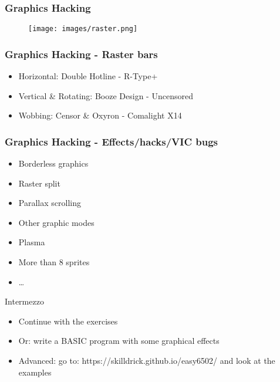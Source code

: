 
\begin{frame}
\frametitle{Graphics Hacking}

\begin{figure}
\texttt{[image: images/raster.png]}
\end{figure}

\end{frame}


\begin{frame}
\frametitle{Graphics Hacking - Raster bars}

\begin{itemize}
\item Horizontal: Double Hotline - R-Type+
\item Vertical \& Rotating: Booze Design - Uncensored
\item Wobbing: Censor \& Oxyron - Comalight X14
\end{itemize}

\end{frame}


\begin{frame}
\frametitle{Graphics Hacking - Effects/hacks/VIC bugs}

\begin{itemize}
\item Borderless graphics
\item Raster split
\item Parallax scrolling
\item Other graphic modes
\item Plasma
\item More than 8 sprites
\item \dots
\end{itemize}

\end{frame}


\begin{frame}{Intermezzo}

\begin{itemize}
\item Continue with the exercises
\item Or: write a BASIC program with some graphical effects
\item Advanced: go to: https://skilldrick.github.io/easy6502/ and look at the examples
\end{itemize}

\end{frame}
